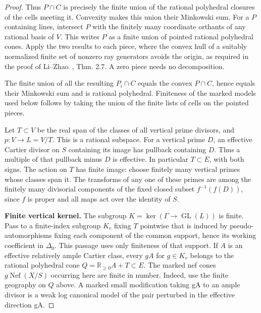 \documentclass[11pt]{article}
\begin{document}
\begin{proof}
Thus \(P\cap C\) is precisely the finite union of the rational polyhedral closures of the cells meeting
it. Convexity makes this union their Minkowski sum. For a \(P\) containing lines, intersect \(P\) with
the finitely many coordinate orthants of any rational basis of \(V\). This writes \(P\) as a finite union
of pointed rational polyhedral cones. Apply the two results to each piece, where the convex hull of a
suitably normalized finite set of nonzero ray generators avoids the origin, as required in the proof of
Li--Zhao~\cite{LiZhao}, Thm. 2.7. A zero piece needs no decomposition.

The finite union of all the resulting \(P_i\cap C\) equals the convex \(P\cap C\), hence equals
their Minkowski sum and is rational polyhedral. Finiteness of the marked models used below follows by
taking the union of the finite lists of cells on the pointed pieces.



Let \(T\subset V\) be the real span of the classes of all vertical prime divisors, and \(p\colon V\to
L=V/T\). This is a rational subspace. For a vertical prime \(D\), an effective Cartier divisor on \(S\)
containing its image has pullback containing \(D\). Thus a multiple of that pullback minus \(D\) is
effective. In particular \(T\subset E\), with both signs. The action on \(T\) has finite image: choose
finitely many vertical primes whose classes span it. The transforms of any one of these primes are among
the finitely many divisorial components of the fixed closed subset \(f^{-1}(f(D))\), since \(f\) is
proper and all maps act over the identity of \(S\).

\textbf{Finite vertical kernel.} The subgroup \(K=\ker(\Gamma\to\operatorname{GL}(L))\) is finite. Pass
to a finite-index subgroup \(K_v\) fixing \(T\) pointwise that is induced by pseudo-automorphisms fixing
each component of the common support, hence its working coefficient in \(\Delta_0\). This passage uses
only finiteness of that support. If \(A\) is an effective relatively ample Cartier class, every \(gA\) for
\(g\in K_v\) belongs to the rational polyhedral cone \(Q=\mathbb R_{\ge0}A+T\subset E\). The
marked nef cones \(g\operatorname{Nef}(X/S)\) occurring here are finite in number. Indeed, use the finite geography on
\(Q\) above. A marked small modification taking gA to an ample divisor is a weak log canonical model of
the pair perturbed in the effective direction gA.


\end{proof}
\end{document}
